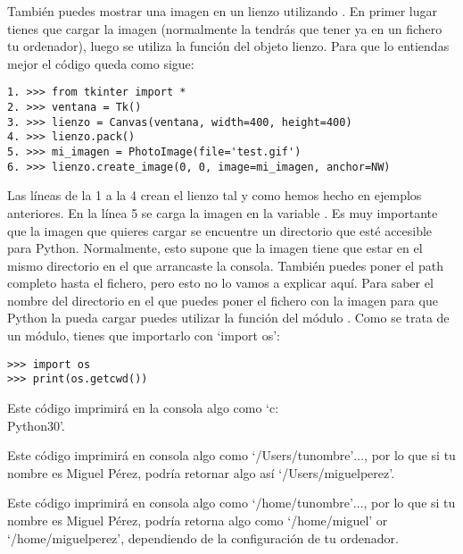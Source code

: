 También puedes mostrar una imagen en un lienzo utilizando . En primer lugar tienes que cargar la imagen (normalmente la tendrás que tener ya en un fichero tu ordenador), luego se utiliza la función  del objeto lienzo. Para que lo entiendas mejor el código queda como sigue:

\begin{listing}
\begin{verbatim}
1. >>> from tkinter import *
2. >>> ventana = Tk()
3. >>> lienzo = Canvas(ventana, width=400, height=400)
4. >>> lienzo.pack()
5. >>> mi_imagen = PhotoImage(file='test.gif')
6. >>> lienzo.create_image(0, 0, image=mi_imagen, anchor=NW)
\end{verbatim}
\end{listing}

Las líneas de la 1 a la 4 crean el lienzo tal y como hemos hecho en ejemplos anteriores. En la línea 5 se carga la imagen en la variable .  Es muy importante que la imagen que quieres cargar se encuentre un directorio que esté accesible para Python. Normalmente, esto supone que la imagen tiene que estar en el mismo directorio en el que arrancaste la consola. También puedes poner el path completo hasta el fichero, pero esto no lo vamos a explicar aquí.  Para saber el nombre del directorio en el que puedes poner el fichero con la imagen para que Python la pueda cargar puedes utilizar la función  del módulo . Como se trata de un módulo, tienes que importarlo con `import os':

\begin{listing}
\begin{verbatim}
>>> import os
>>> print(os.getcwd())
\end{verbatim}
\end{listing}

\begin{WINDOWS}
Este código imprimirá en la consola algo como `c:\\Python30'.
\end{WINDOWS}

\begin{MAC}
Este código imprimirá en consola algo como `/Users/tunombre'$\ldots$, por lo que si tu nombre es Miguel Pérez,  podría retornar algo así `/Users/miguelperez'.
\end{MAC}

\begin{LINUX}
Este código imprimirá en consola algo como `/home/tunombre'$\ldots$, por lo que si tu nombre es Miguel Pérez,  podría retorna algo como `/home/miguel' or `/home/miguelperez', dependiendo de la configuración de tu ordenador.
\end{LINUX}

